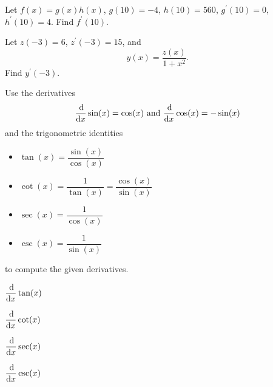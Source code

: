 \documentclass[10pt]{amsart}
\begin{document}
\vspace{1.25in}

\begin{thm}
  Let \(f(x) = g(x)h(x)\), \(g(10) = -4\), \(h(10) = 560\), \(g^\prime(10) = 0\), \(h^\prime(10) = 4\).
  Find \(f^\prime(10)\).
\end{thm}

\vspace{2in}

\begin{thm}
  Let \(z(-3) = 6\), \(z^\prime(-3) = 15\), and
  \[y(x) = \frac{z(x)}{1 + x^2}.\]
  Find \(y^\prime(-3)\).
\end{thm}

\newpage

\noindent
Use the derivatives
\[\frac{\dif}{\dif x} \sin(x) = \cos(x) \ \text{and}\ \frac{\dif}{\dif x} \cos(x) = - \sin(x)\]
and the trigonometric identities
\begin{multicols}{2}
  \begin{itemize}
\item
  \(\tan(x) = \dfrac{\sin(x)}{\cos(x)}\)
\item
  \(\cot(x) = \dfrac{1}{\tan(x)} = \dfrac{\cos(x)}{\sin(x)}\)
\item
  \(\sec(x) = \dfrac{1}{\cos(x)}\)
\item
  \(\csc(x) = \dfrac{1}{\sin(x)}\)
  \end{itemize}
\end{multicols}
\noindent to compute the given derivatives.

\begin{thm}
  \(\dfrac{\dif}{\dif x} \tan(x)\)
\end{thm}

\vspace{3in}

\begin{thm}
  \(\dfrac{\dif}{\dif x} \cot(x)\)
\end{thm}

\newpage

\begin{thm}
  \(\dfrac{\dif}{\dif x} \sec(x)\)
\end{thm}

\vspace{4in}
\begin{thm}
  \(\dfrac{\dif}{\dif x} \csc(x)\)
\end{thm}
\end{document}
